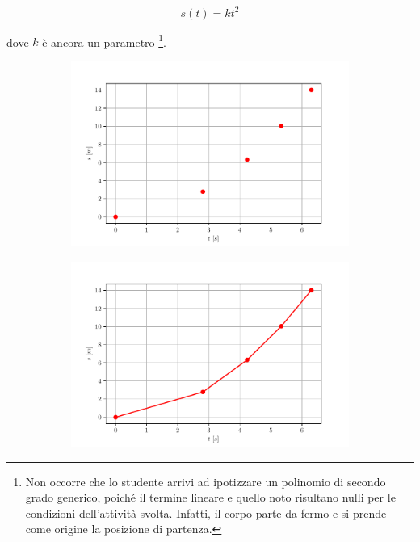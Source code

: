 \documentclass{report} \usepackage[T1]{fontenc} \usepackage[italian]{babel}
\begin{document}
\begin{equation}
s(t) = kt^2
\end{equation}

dove $k$ è ancora un parametro
\footnote{
          Non occorre che lo studente arrivi ad ipotizzare un polinomio di secondo grado generico,
          poiché il termine lineare e quello noto risultano nulli per le condizioni
          dell’attività svolta. Infatti, il corpo parte da fermo e si prende come origine
          la posizione di partenza.
         }.

\begin{figure}[H]
\centering
  \begin{subfigure}[b]{0.49\textwidth}
  \includegraphics[width=\textwidth]{s-t_parabola1}
  \end{subfigure}
  \begin{subfigure}[b]{0.49\textwidth}
  \includegraphics[width=\textwidth]{s-t_parabola2}

\end{subfigure}
\end{figure}
\end{document}
